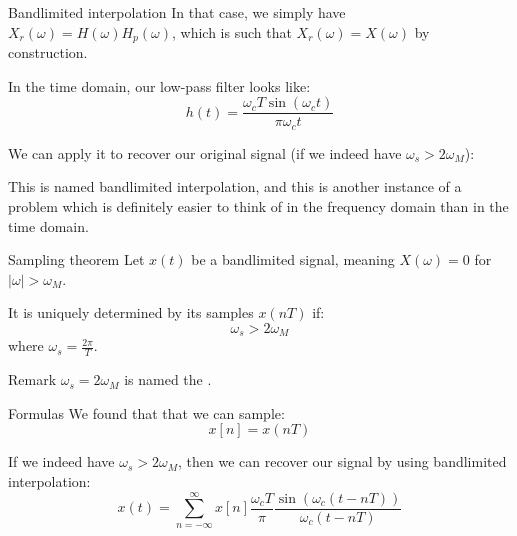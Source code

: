 \documentclass[a4paper]{article}
\begin{document}
\begin{parag}{Bandlimited interpolation}
    In that case, we simply have $X_r\left(\omega\right) = H\left(\omega\right) H_p\left(\omega\right)$, which is such that $X_r\left(\omega\right) = X\left(\omega\right)$ by construction. 

    In the time domain, our low-pass filter looks like: 
    \[h\left(t\right) =  \frac{\omega_c T \sin\left(\omega_c t\right)}{\pi \omega_c t}\]
    
    We can apply it to recover our original signal (if we indeed have $\omega_s > 2 \omega_M$): 
    
    This is named bandlimited interpolation, and this is another instance of a problem which is definitely easier to think of in the frequency domain than in the time domain.
\end{parag}

\begin{parag}{Sampling theorem}
    Let $x\left(t\right)$ be a bandlimited signal, meaning $X\left(\omega\right) = 0$ for $\left|\omega\right| > \omega_M$.

    It is uniquely determined by its samples $x\left(nT\right)$ if: 
    \[\omega_s > 2 \omega_M\]
    where $\omega_s = \frac{2\pi}{T}$.

    \begin{subparag}{Remark}
        $\omega_s = 2 \omega_M$ is named the .
    \end{subparag}

    \begin{subparag}{Formulas}
        We found that that we can sample:
        \[x\left[n\right] = x\left(nT\right)\]

        If we indeed have $\omega_s > 2 \omega_M$, then we can recover our signal by using bandlimited interpolation: 
        \[x\left(t\right) = \sum_{n=-\infty}^{\infty} x\left[n\right] \frac{\omega_c T}{\pi} \frac{\sin\left(\omega_c\left(t - nT\right)\right)}{\omega_c\left(t - nT\right)}\]
    \end{subparag}
    
\end{parag}
\end{document}
